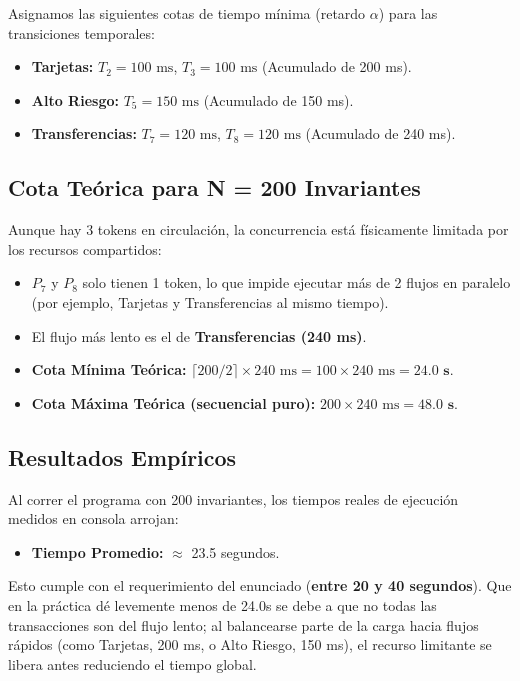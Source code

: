 \documentclass[12pt,a4paper]{article}
\begin{document}
Asignamos las siguientes cotas de tiempo mínima (retardo $\alpha$) para las transiciones temporales:
\begin{itemize}
    \item \textbf{Tarjetas:} $T_2 = 100\text{ ms}$, $T_3 = 100\text{ ms}$ (Acumulado de 200 ms).
    \item \textbf{Alto Riesgo:} $T_5 = 150\text{ ms}$ (Acumulado de 150 ms).
    \item \textbf{Transferencias:} $T_7 = 120\text{ ms}$, $T_8 = 120\text{ ms}$ (Acumulado de 240 ms).
\end{itemize}

\subsection{Cota Teórica para N = 200 Invariantes}
Aunque hay 3 tokens en circulación, la concurrencia está físicamente limitada por los recursos compartidos:
\begin{itemize}
    \item $P_7$ y $P_8$ solo tienen 1 token, lo que impide ejecutar más de 2 flujos en paralelo (por ejemplo, Tarjetas y Transferencias al mismo tiempo).
    \item El flujo más lento es el de \textbf{Transferencias (240 ms)}.
    \item \textbf{Cota Mínima Teórica:} $\lceil 200 / 2 \rceil \times 240\text{ ms} = 100 \times 240\text{ ms} = \mathbf{24.0 \text{ s}}$.
    \item \textbf{Cota Máxima Teórica (secuencial puro):} $200 \times 240\text{ ms} = \mathbf{48.0 \text{ s}}$.
\end{itemize}

\subsection{Resultados Empíricos}
Al correr el programa con 200 invariantes, los tiempos reales de ejecución medidos en consola arrojan:
\begin{itemize}
    \item \textbf{Tiempo Promedio:} $\approx$ 23.5 segundos.
\end{itemize}
Esto cumple con el requerimiento del enunciado (\textbf{entre 20 y 40 segundos}). Que en la práctica dé levemente menos de 24.0s se debe a que no todas las transacciones son del flujo lento; al balancearse parte de la carga hacia flujos rápidos (como Tarjetas, 200 ms, o Alto Riesgo, 150 ms), el recurso limitante se libera antes reduciendo el tiempo global.
\end{document}
